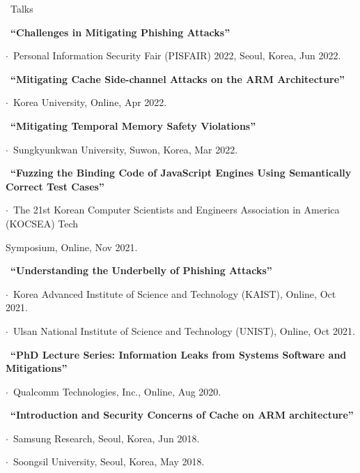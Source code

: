 \documentclass{resume} %
\begin{document}

\begin{rSection}{\faGenderless~Talks}

	\strut\textbullet~{\bf ``Challenges in Mitigating Phishing Attacks''}\\
	\strut\hspace{1cm}$\cdot$~Personal Information Security Fair (PISFAIR) 2022, Seoul, Korea, Jun 2022.

	\strut\textbullet~{\bf ``Mitigating Cache Side-channel Attacks on the ARM Architecture''}\\
	\strut\hspace{1cm}$\cdot$~Korea University, Online, Apr 2022.

	\strut\textbullet~{\bf ``Mitigating Temporal Memory Safety Violations''}\\
	\strut\hspace{1cm}$\cdot$~Sungkyunkwan University, Suwon, Korea, Mar 2022.

	\strut\textbullet~{\bf ``Fuzzing the Binding Code of JavaScript Engines Using Semantically Correct Test Cases''}\\
	\strut\hspace{1cm}$\cdot$~The 21st Korean Computer Scientists and Engineers Association in America (KOCSEA) Tech\\ \strut\hspace{1cm} Symposium, Online, Nov 2021.

	\strut\textbullet~{\bf ``Understanding the Underbelly of Phishing Attacks''}\\
	\strut\hspace{1cm}$\cdot$~Korea Advanced Institute of Science and Technology (KAIST), Online, Oct 2021.\\
	\strut\hspace{1cm}$\cdot$~Ulsan National Institute of Science and Technology (UNIST), Online, Oct 2021.

    \strut\textbullet~{\bf ``PhD Lecture Series: Information Leaks from Systems Software and Mitigations''}\\
    \strut\hspace{1cm}$\cdot$~Qualcomm Technologies, Inc., Online, Aug 2020.
	
    \strut\textbullet~{\bf ``Introduction and Security Concerns of Cache on ARM architecture''}\\
	\strut\hspace{1cm}$\cdot$~Samsung Research, Seoul, Korea, Jun 2018.\\
	\strut\hspace{1cm}$\cdot$~Soongsil University, Seoul, Korea, May 2018.

	\vspace{3mm}
\end{rSection}
\end{document}
